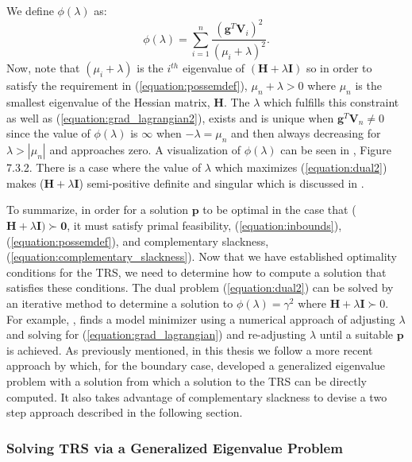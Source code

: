 \documentclass[letterpaper,12pt,titlepage,oneside,final]{book}
\begin{document}
	We define $\phi(\lambda)$ as:
	\begin{equation}
	\phi(\lambda) = \sum_{i=1}^{n}{\frac{(\mathbf{g}^{T}\mathbf{V}_{i})^{2}}{(\mu_{i} + \lambda)^{2}}}.
	\label{phi}
	\end{equation}
	Now, note that $(\mu_{i} + \lambda)$ is the $i^{th}$ eigenvalue of $(\mathbf{H} + \lambda\mathbf{I})$ so in order to satisfy the requirement in (\ref{equation:possemdef}), $\mu_{n} + \lambda > 0$ where $\mu_{n}$ is the smallest eigenvalue of the Hessian matrix, $\mathbf{H}$. The $\lambda$ which fulfills this constraint as well as (\ref{equation:grad_lagrangian2}), exists and is unique when $\mathbf{g}^{T}\mathbf{V}_{n}\neq0$ since the value of $\phi(\lambda)$ is $\infty$ when $-\lambda = \mu_{n}$ and then always decreasing for $\lambda > |\mu_{n}|$ and approaches zero. A visualization of $\phi(\lambda)$ can be seen in \cite{TRM.book}, Figure 7.3.2. There is a case where the value of $\lambda$ which maximizes (\ref{equation:dual2}) makes ($\mathbf{H}+\lambda\mathbf{I}$) semi-positive definite and singular which is discussed in \cite{adachi.paper}. 

	To summarize, in order for a solution $\mathbf{p}$ to be optimal in the case that ($\mathbf{H} + \lambda\mathbf{I}) \succ \mathbf{0}$, it must satisfy primal feasibility, (\ref{equation:inbounds}), (\ref{equation:possemdef}), and complementary slackness, (\ref{equation:complementary_slackness}). Now that we have established optimality conditions for the TRS, we need to determine how to compute a solution that satisfies these conditions. The dual problem (\ref{equation:dual2}) can be solved by an iterative method to determine a solution to $\phi(\lambda) = \gamma^{2}$ where $\mathbf{H} + \lambda \mathbf{I} \succ 0$. For example, \cite{TRM.book}, finds a model minimizer using a numerical approach of adjusting $\lambda$ and solving for (\ref{equation:grad_lagrangian}) and re-adjusting $\lambda$ until a suitable $\mathbf{p}$ is achieved. As previously mentioned, in this thesis we follow a more recent approach by \cite{adachi.paper} which, for the boundary case, developed a generalized eigenvalue problem with a solution from which a solution to the TRS can be directly computed. It also takes advantage of complementary slackness to devise a two step approach described in the following section. 
	
	\subsubsection{Solving TRS via a Generalized Eigenvalue Problem}
	
\end{document}

